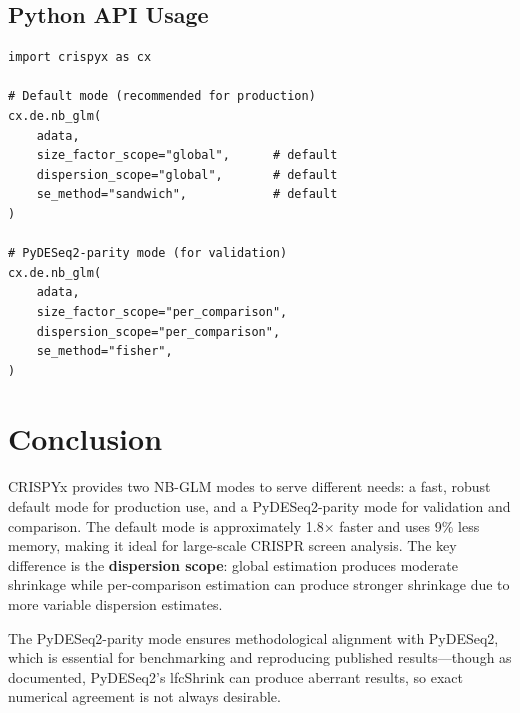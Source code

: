 \documentclass{article}
\begin{document}
\subsection{Python API Usage}

\begin{lstlisting}[caption={Direct Python API usage}]
import crispyx as cx

# Default mode (recommended for production)
cx.de.nb_glm(
    adata,
    size_factor_scope="global",      # default
    dispersion_scope="global",       # default
    se_method="sandwich",            # default
)

# PyDESeq2-parity mode (for validation)
cx.de.nb_glm(
    adata,
    size_factor_scope="per_comparison",
    dispersion_scope="per_comparison",
    se_method="fisher",
)
\end{lstlisting}

\section{Conclusion}

CRISPYx provides two NB-GLM modes to serve different needs: a fast, robust default mode for production use, and a PyDESeq2-parity mode for validation and comparison. The default mode is approximately 1.8$\times$ faster and uses 9\% less memory, making it ideal for large-scale CRISPR screen analysis. The key difference is the \textbf{dispersion scope}: global estimation produces moderate shrinkage while per-comparison estimation can produce stronger shrinkage due to more variable dispersion estimates.

The PyDESeq2-parity mode ensures methodological alignment with PyDESeq2, which is essential for benchmarking and reproducing published results---though as documented, PyDESeq2's lfcShrink can produce aberrant results, so exact numerical agreement is not always desirable.
\end{document}
